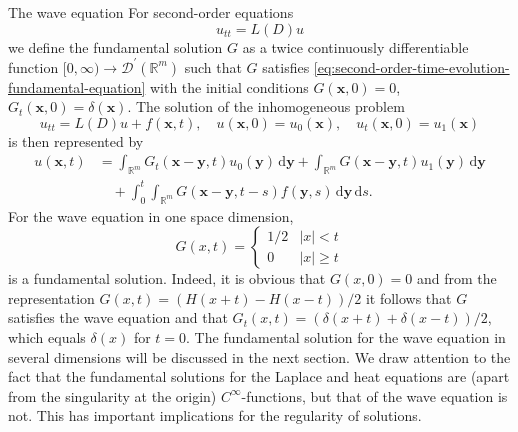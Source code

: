 \begin{Example}{The wave equation}
\label{ex:wave-fundamental-solution}
For second-order equations
\begin{equation}\label{eq:second-order-time-evolution-fundamental-equation}
u_{tt}=L(D)u
\end{equation}
we define the fundamental solution $G$ as a twice continuously differentiable function $[0,\infty)\to\mathcal{D}^{\prime}(\mathbb{R}^m)$ such that $G$ satisfies \eqref{eq:second-order-time-evolution-fundamental-equation} with the initial conditions $G(\bm{x},0)=0$, $G_t(\bm{x},0)=\delta(\bm{x})$. The solution of the inhomogeneous problem
\begin{equation}\label{eq:second-order-evolution-inhomogeneous-initial-problem}
u_{tt}=L(D)u+f(\bm{x},t),\quad u(\bm{x},0)=u_0(\bm{x}),\quad u_t(\bm{x},0)=u_1(\bm{x})
\end{equation}
is then represented by
\begin{equation}\label{eq:second-order-evolution-fundamental-solution-formula}
\begin{aligned}
u(\bm{x},t)&=\int_{\mathbb{R}^m}G_t(\bm{x}-\bm{y},t)u_0(\bm{y})\,\mathrm{d}\bm{y}
+\int_{\mathbb{R}^m}G(\bm{x}-\bm{y},t)u_1(\bm{y})\,\mathrm{d}\bm{y}\\
&\quad+\int_0^t\int_{\mathbb{R}^m}G(\bm{x}-\bm{y},t-s)f(\bm{y},s)\,\mathrm{d}\bm{y}\,\mathrm{d}s.
\end{aligned}
\end{equation}
For the wave equation in one space dimension,
\begin{equation}\label{eq:wave-one-dimensional-fundamental-solution}
G(x,t)=\begin{cases}1/2&|x|<t\\0&|x|\geq t\end{cases}
\end{equation}
is a fundamental solution. Indeed, it is obvious that $G(x,0)=0$ and from the representation $G(x,t)=(H(x+t)-H(x-t))/2$ it follows that $G$ satisfies the wave equation and that $G_t(x,t)=(\delta(x+t)+\delta(x-t))/2$, which equals $\delta(x)$ for $t=0$. The fundamental solution for the wave equation in several dimensions will be discussed in the next section. We draw attention to the fact that the fundamental solutions for the Laplace and heat equations are (apart from the singularity at the origin) $C^\infty$-functions, but that of the wave equation is not. This has important implications for the regularity of solutions.
\end{Example}

